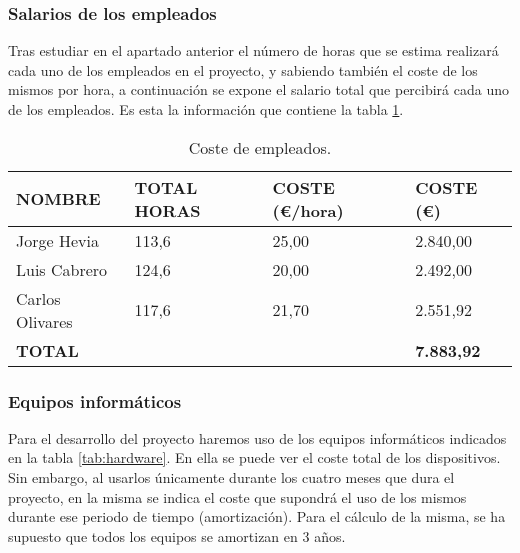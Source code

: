 \subsubsection{Salarios de los empleados}
\par Tras estudiar en el apartado anterior el número de horas que se estima realizará cada uno de los empleados en el proyecto, y sabiendo también el coste de los mismos por hora, a continuación se expone el salario total que percibirá cada uno de los empleados. Es esta la información que contiene la tabla \ref{tab:costePersonal}.

\begin{table}[H]
\begin{center}
\begin{tabular}{l l l l}
\textbf{NOMBRE} & \textbf{TOTAL HORAS} & \textbf{COSTE (\euro/hora)} & \textbf{COSTE (\euro)} \\ \hline \hline
Jorge Hevia & 113,6 & 25,00 & 2.840,00\\
Luis Cabrero & 124,6 & 20,00 & 2.492,00\\
Carlos Olivares & 117,6 & 21,70 & 2.551,92\\ \hline \hline
\textbf{TOTAL} & & & \textbf{7.883,92} \\ \hline
\end{tabular}
\caption{Coste de empleados.}
\label{tab:costePersonal}
\end{center}
\end{table}



\subsubsection{Equipos informáticos}
\par Para el desarrollo del proyecto haremos uso de los equipos informáticos indicados en la tabla \ref{tab:hardware}. En ella se puede ver el coste total de los dispositivos. Sin embargo, al usarlos únicamente durante los cuatro meses que dura el proyecto, en la misma se indica el coste que supondrá el uso de los mismos durante ese periodo de tiempo (amortización). Para el cálculo de la misma, se ha supuesto que todos los equipos se amortizan en 3 años.

